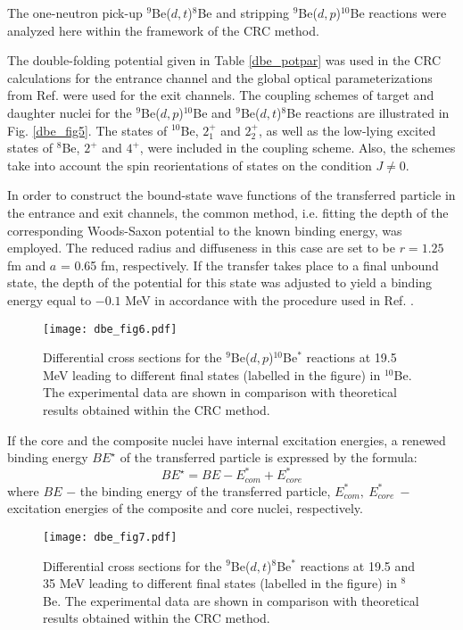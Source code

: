 \documentclass[
12pt, %
oneside, %
english, %
doublespacing, %
doublespacing, %
toctotoc, %
parskip, %
headsepline, %
]{MastersDoctoralThesis} %
\begin{document}
The one-neutron pick-up ${}^9$Be($d,t$)${}^8$Be and stripping ${}^9$Be($d,p$)${}^{10}$Be reactions were analyzed here within the framework of  the CRC method.

The double-folding potential given in Table \ref{dbe_potpar} was used in the CRC calculations for the entrance channel and the global optical parameterizations from Ref. \cite{globalProton, globalTriton} were used for the exit channels. The coupling schemes of target and daughter nuclei for the ${}^9$Be($d,p$)${}^{10}$Be and ${}^9$Be($d,t$)${}^8$Be  reactions  are illustrated in Fig. \ref{dbe_fig5}. The states of ${}^{10}$Be, $2^+_{1}$ and $2^+_{2}$, as well as the low-lying excited states of ${}^8$Be, $2^+$ and $4^+$, were included in the coupling scheme. Also, the schemes take into account the spin reorientations of states on the condition $J \neq 0$.

In order to construct the bound-state wave functions of the transferred particle in the entrance and exit channels, the common method, i.e. fitting the depth of the corresponding Woods-Saxon potential to the known binding energy, was employed. The reduced radius and diffuseness in this case are set to be $r = 1.25$ fm and $a$ = 0.65 fm, respectively. If the transfer takes place to a final unbound state, the depth of the potential for this state was adjusted to yield a binding energy equal to $-0.1$ MeV in accordance with the procedure used in Ref. \cite{harakeh1980strong}.

\begin{figure}[tp]
\centering
\texttt{[image: dbe\_fig6.pdf]}
\decoRule
\caption{\label{dbe_fig6}  Differential cross sections for the ${}^9$Be($d,p$)${}^{10}$Be$^*$ reactions at 19.5 MeV leading to different final states (labelled in the figure) in ${}^{10}$Be. The experimental data are shown in comparison with theoretical results obtained within the CRC method.}
\end{figure}

If the core and the composite nuclei have internal excitation energies, a renewed binding energy $BE^{\star}$ of the transferred particle is expressed by the formula:
\begin{equation} BE^{\star}=BE - E_{com}^*+E_{core}^* \end{equation}
where $BE$ $-$ the binding energy of the transferred particle, $E_{com}^*,~E_{core}^*~-$  excitation energies of the composite and  core nuclei, respectively.

\begin{figure}[tp]
\centering
\texttt{[image: dbe\_fig7.pdf]}
\decoRule
\caption{
\label{dbe_fig7}
 Differential cross sections for the ${}^9$Be($d,t$)${}^{8}$Be$^*$ reactions at 19.5 and 35 MeV leading to different final states (labelled in the figure) in ${}^{8}$Be. The experimental data are shown in comparison with  theoretical results obtained within the CRC method.}
\end{figure}
\end{document}

